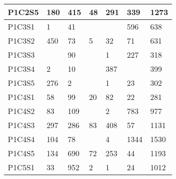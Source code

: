 \begin{longtable}{lllllll}
\multicolumn{1}{|l|}{P1C2S5} & \multicolumn{1}{l|}{180} & \multicolumn{1}{l|}{415} & \multicolumn{1}{l|}{48} & \multicolumn{1}{l|}{291} & \multicolumn{1}{l|}{339} & \multicolumn{1}{l|}{1273} \\ \hline
\multicolumn{1}{|l|}{P1C3S1} & \multicolumn{1}{l|}{1} & \multicolumn{1}{l|}{41} & \multicolumn{1}{l|}{} & \multicolumn{1}{l|}{} & \multicolumn{1}{l|}{596} & \multicolumn{1}{l|}{638} \\ \hline
\multicolumn{1}{|l|}{P1C3S2} & \multicolumn{1}{l|}{450} & \multicolumn{1}{l|}{73} & \multicolumn{1}{l|}{5} & \multicolumn{1}{l|}{32} & \multicolumn{1}{l|}{71} & \multicolumn{1}{l|}{631} \\ \hline
\multicolumn{1}{|l|}{P1C3S3} & \multicolumn{1}{l|}{} & \multicolumn{1}{l|}{90} & \multicolumn{1}{l|}{} & \multicolumn{1}{l|}{1} & \multicolumn{1}{l|}{227} & \multicolumn{1}{l|}{318} \\ \hline
\multicolumn{1}{|l|}{P1C3S4} & \multicolumn{1}{l|}{2} & \multicolumn{1}{l|}{10} & \multicolumn{1}{l|}{} & \multicolumn{1}{l|}{387} & \multicolumn{1}{l|}{} & \multicolumn{1}{l|}{399} \\ \hline
\multicolumn{1}{|l|}{P1C3S5} & \multicolumn{1}{l|}{276} & \multicolumn{1}{l|}{2} & \multicolumn{1}{l|}{} & \multicolumn{1}{l|}{1} & \multicolumn{1}{l|}{23} & \multicolumn{1}{l|}{302} \\ \hline
\multicolumn{1}{|l|}{P1C4S1} & \multicolumn{1}{l|}{58} & \multicolumn{1}{l|}{99} & \multicolumn{1}{l|}{20} & \multicolumn{1}{l|}{82} & \multicolumn{1}{l|}{22} & \multicolumn{1}{l|}{281} \\ \hline
\multicolumn{1}{|l|}{P1C4S2} & \multicolumn{1}{l|}{83} & \multicolumn{1}{l|}{109} & \multicolumn{1}{l|}{} & \multicolumn{1}{l|}{2} & \multicolumn{1}{l|}{783} & \multicolumn{1}{l|}{977} \\ \hline
\multicolumn{1}{|l|}{P1C4S3} & \multicolumn{1}{l|}{297} & \multicolumn{1}{l|}{286} & \multicolumn{1}{l|}{83} & \multicolumn{1}{l|}{408} & \multicolumn{1}{l|}{57} & \multicolumn{1}{l|}{1131} \\ \hline
\multicolumn{1}{|l|}{P1C4S4} & \multicolumn{1}{l|}{104} & \multicolumn{1}{l|}{78} & \multicolumn{1}{l|}{} & \multicolumn{1}{l|}{4} & \multicolumn{1}{l|}{1344} & \multicolumn{1}{l|}{1530} \\ \hline
\multicolumn{1}{|l|}{P1C4S5} & \multicolumn{1}{l|}{134} & \multicolumn{1}{l|}{690} & \multicolumn{1}{l|}{72} & \multicolumn{1}{l|}{253} & \multicolumn{1}{l|}{44} & \multicolumn{1}{l|}{1193} \\ \hline
\multicolumn{1}{|l|}{P1C5S1} & \multicolumn{1}{l|}{33} & \multicolumn{1}{l|}{952} & \multicolumn{1}{l|}{2} & \multicolumn{1}{l|}{1} & \multicolumn{1}{l|}{24} & \multicolumn{1}{l|}{1012} \\ \hline

\end{longtable}
